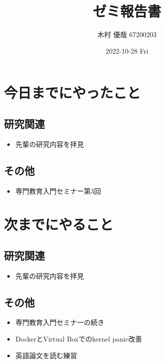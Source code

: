 \documentclass[uplatex, onecolumn, 10pt]{jsarticle}
\begin{document}
\title{\vspace{-40mm}\bf{\LARGE{ゼミ報告書}}}
\author{\vspace{-40mm}木村 優哉 67200203}
\date{2022-10-28 Fri}
\maketitle


\section{今日までにやったこと}

\subsection*{研究関連} 
\begin{itemize}
	\item 先輩の研究内容を拝見
\end{itemize}

\subsection*{その他}
\begin{itemize}
	\item 専門教育入門セミナー第3回
\end{itemize}


\section{次までにやること}

\subsection*{研究関連} 
\begin{itemize}
	\item 先輩の研究内容を拝見
\end{itemize}

\subsection*{その他}
\begin{itemize}
	\item 専門教育入門セミナーの続き
	\item DockerとVirtual Boxでのkernel panic改善
	\item 英語論文を読む練習
\end{itemize}
\end{document}
